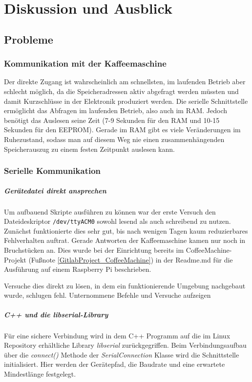 \chapter{Diskussion und Ausblick}

\section{Probleme}

\subsection{Kommunikation mit der Kaffeemaschine} \label{subsec:zugangSeriellDirekt}
Der direkte Zugang ist wahrscheinlich am schnellsten, im laufenden Betrieb aber schlecht möglich, da die Speicheradressen aktiv abgefragt werden müssten und damit Kurzschlüsse in der Elektronik produziert werden.
Die serielle Schnittstelle ermöglicht das Abfragen im laufenden Betrieb, also auch im \ac{RAM}.
Jedoch benötigt das Auslesen seine Zeit (7-9 Sekunden für den \ac{RAM} und 10-15 Sekunden für den \ac{EEPROM}).
Gerade im \ac{RAM} gibt es viele Veränderungen im Ruhezustand, sodass man auf diesem Weg nie einen zusammenhängenden Speicherauszug zu einem festen Zeitpunkt auslesen kann.

\subsection{Serielle Kommunikation} \label{subsec:kommunikationGeraetedateiLibserialLibrary}
\paragraph{Gerätedatei direkt ansprechen}
Um aufbauend Skripte ausführen zu können war der erste Versuch den Dateideskriptor \texttt{/dev/ttyACM0} sowohl lesend als auch schreibend zu nutzen.
Zunächst funktionierte dies sehr gut, bis nach wenigen Tagen kaum reduzierbares Fehlverhalten auftrat.
Gerade Antworten der Kaffeemaschine kamen nur noch in Bruchstücken an.
Dies wurde bei der Einrichtung bereits im CoffeeMachine-Projekt (Fußnote \ref{GitlabProject_CoffeeMachine}) in der Readme.md für die Ausführung auf einem Raspberry Pi beschrieben.

Versuche dies direkt zu lösen, in dem ein funktionierende Umgebung nachgebaut wurde, schlugen fehl.
\todo Unternommene Befehle und Versuche aufzeigen

\paragraph{C++ und die \textit{libserial}-Library}
Für eine sichere Verbindung wird in dem C++ Programm auf die im Linux Repository erhältliche Library \textit{libserial} zurückgegriffen.
Beim Verbindungsaufbau über die \textit{connect()} Methode der \textit{SerialConnection} Klasse wird die Schnittstelle initialisiert.
Hier werden der Gerätepfad, die Baudrate und eine erwartete Mindestlänge festgelegt.

